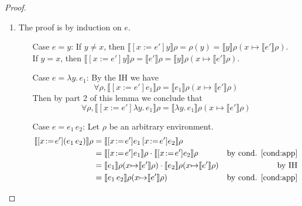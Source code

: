 \documentclass{tufte-handout}
\newcommand{\SEM}[1]{\llbracket #1 \rrbracket}
\newcommand{\LAM}[1]{\lambda #1.\,}
\newcommand{\APP}[0]{\,}
\newcommand{\by}[0]{\!:=\!}
\newcommand{\ext}[3]{#3(#1{\mapsto}#2)}
\begin{document}
\begin{proof}
\begin{enumerate}
\begin{itemize}
    
  \end{itemize}
  
\item The proof is by induction on $e$.
  \begin{itemize}
  \item[Case $e=y$:]
    If $y \neq x$, then
    $\SEM{[x\by e']y}\rho = \rho(y) = \SEM{y}\ext{x}{\SEM{e'}\rho}{\rho}$.\\
    If $y = x$, then
    $\SEM{[x\by e']y}\rho = \SEM{e'}\rho = \SEM{y}\ext{x}{\SEM{e'}\rho}{\rho}$.
  \item[Case $e=\LAM{y}e_1$:]
    By the IH we have
    \[
    \forall \rho, \SEM{ [x\by e']e_1} \rho = \SEM{e_1}\ext{x}{\SEM{e'}\rho}{\rho}
    \]
    Then by part 2 of this lemma we conclude that
    \[
    \forall \rho, \SEM{[x\by e']\LAM{y}e_1}\rho = \SEM{\LAM{y}e_1}\ext{x}{\SEM{e'}\rho}{\rho}
    \]
    
  \item[Case $e=e_1\APP e_2$:]
    Let $\rho$ be an arbitrary environment.
    \begin{align*}
      \SEM{[x\by e'](e_1 \APP e_2)} \rho
      &= \SEM{[x\by e']e_1 \APP [x\by e']e_2} \rho \\
      &= \SEM{[x\by e']e_1}\rho \cdot \SEM{[x\by e']e_2} \rho
         & \text{by cond. \ref{cond:app}}\\
      &= \SEM{e_1}\ext{x}{\SEM{e'}\rho}{\rho}
          \cdot \SEM{e_2}\ext{x}{\SEM{e'}\rho}{\rho}
         & \text{by IH}\\
      &= \SEM{e_1 \APP e_2}\ext{x}{\SEM{e'}\rho}{\rho}
         & \text{by cond. \ref{cond:app}}
    \end{align*}
    
    
  \end{itemize}
  
\end{enumerate}
\end{proof}
\end{document}
